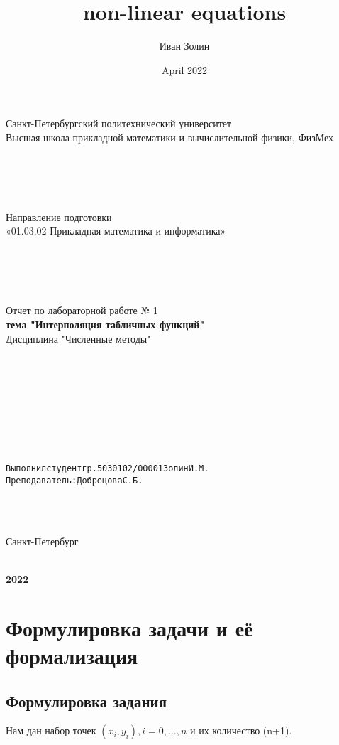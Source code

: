 \documentclass{article}
\title{non-linear equations}
\author{Иван Золин}
\date{April 2022}
\begin{document}
	
	\large
	\begin{center}
		
		Санкт-Петербургский политехнический университет\\
		Высшая школа прикладной математики и вычислительной физики, ФизМех
		
		~\\
		~\\
		~\\
		~\\
		Направление подготовки\\
		«01.03.02 Прикладная математика и информатика»
		
		~\\
		~\\
		~\\
		~\\
		Отчет по лабораторной работе № 1\\
		\textbf{тема "Интерполяция табличных функций" }	
		~\\	Дисциплина "Численные методы"
	\end{center}
	
	~\\
	~\\
	~\\
	~\\
	~\\
	~\\
	~\\
	\begin{alltt}
		Выполнил студент гр. 5030102/00001			  		   		  Золин И.М.
		Преподаватель: 				              	        	Добрецова С.Б.
	\end{alltt}
	
	~\\
	~\\
	\begin{center}
		Санкт-Петербург
		
		~\\
		\textbf{2022}
	\end{center}{}
	
	\newpage
	
	\section{Формулировка задачи и её формализация}
	\subsection{Формулировка задания}
	Нам дан набор точек $(x_i,y_i), i = 0,..., n$ и их количество (n+1).
	
\end{document}
